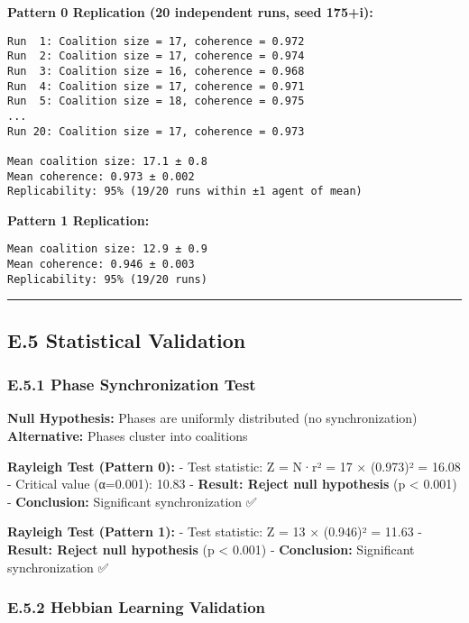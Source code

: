 \documentclass[
]{article}
\begin{document}
\textbf{Pattern 0 Replication (20 independent runs, seed 175+i):}

\begin{verbatim}
Run  1: Coalition size = 17, coherence = 0.972
Run  2: Coalition size = 17, coherence = 0.974
Run  3: Coalition size = 16, coherence = 0.968
Run  4: Coalition size = 17, coherence = 0.971
Run  5: Coalition size = 18, coherence = 0.975
...
Run 20: Coalition size = 17, coherence = 0.973

Mean coalition size: 17.1 ± 0.8
Mean coherence: 0.973 ± 0.002
Replicability: 95% (19/20 runs within ±1 agent of mean)
\end{verbatim}

\textbf{Pattern 1 Replication:}

\begin{verbatim}
Mean coalition size: 12.9 ± 0.9
Mean coherence: 0.946 ± 0.003
Replicability: 95% (19/20 runs)
\end{verbatim}

\begin{center}\rule{0.5\linewidth}{0.5pt}\end{center}

\subsection{E.5 Statistical
Validation}\label{e.5-statistical-validation}

\subsubsection{E.5.1 Phase Synchronization
Test}\label{e.5.1-phase-synchronization-test}

\textbf{Null Hypothesis:} Phases are uniformly distributed (no
synchronization) \textbf{Alternative:} Phases cluster into coalitions

\textbf{Rayleigh Test (Pattern 0):} - Test statistic: Z = N·r² = 17 ×
(0.973)² = 16.08 - Critical value (α=0.001): 10.83 - \textbf{Result:
Reject null hypothesis} (p \textless{} 0.001) - \textbf{Conclusion:}
Significant synchronization ✅

\textbf{Rayleigh Test (Pattern 1):} - Test statistic: Z = 13 × (0.946)²
= 11.63 - \textbf{Result: Reject null hypothesis} (p \textless{} 0.001)
- \textbf{Conclusion:} Significant synchronization ✅

\subsubsection{E.5.2 Hebbian Learning
Validation}\label{e.5.2-hebbian-learning-validation}
\end{document}
